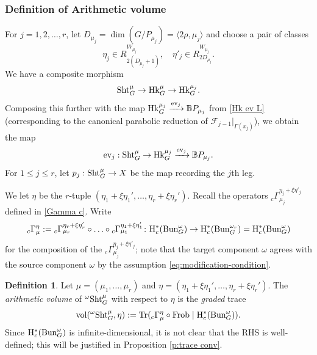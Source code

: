 \documentclass[reqno]{amsart}
\numberwithin{equation}{subsection}
\theoremstyle{definition}
\newtheorem{defn}[subsubsection]{Definition}
\def\BB{\mathbb{B}}
\newcommand\cF{\mathcal{F}}
\newcommand{\Bun}{\textup{Bun}}
\newcommand\ev{\textup{ev}}
\newcommand\Frob{\textup{Frob}}
\newcommand\Hk{\mathrm{Hk}}
\newcommand\Sht{\textup{Sht}}
\newcommand{\Tr}{\textup{Tr}}
\newcommand{\vol}{\textup{vol}}
\renewcommand{\j}[1]{\langle{#1}\rangle}
\newcommand\xr{\xrightarrow}
\newcommand\G\Gamma
\renewcommand\r\rho
\newcommand{\y}{\eta}
\newcommand{\om}{\omega}
\newcommand{\co}{\colon}
\newcommand{\rH}{\ensuremath{\mathrm{H}}\xspace}
\begin{document}
\subsubsection{Definition of Arithmetic volume}
For $j = 1, 2, \ldots, r$, let $D_{\mu_j}=\dim (G/P_{\mu_{j}})=\j{2\r, \mu_{j}}$ and choose a pair of classes
\begin{equation*}
\y_{j}\in R^{W_{\mu_{j}}}_{2(D_{\mu_j}+1)}, \quad \y'_{j}\in R^{W_{\mu_{j}}}_{2D_{\mu_j}}.
\end{equation*}
We have a composite morphism 
\begin{equation*}
\Sht^{\mu}_{G}\to \Hk_G^\mu \to \Hk_G^{\mu_{j}}.
\end{equation*}
Composing this further with the map $\Hk_G^{\mu_{j}} \xrightarrow{\ev_{j}} \BB P_{\mu_{j}}$ from \eqref{Hk ev L} (corresponding to the canonical parabolic reduction of $\cF_{j-1}|_{\G(x_j)}$), we obtain the map 
\begin{equation*}
\ev_{j}: \Sht^{\mu}_{G} \rightarrow \Hk_G^{\mu_{j}}  \xr{\ev_{j}} \BB P_{\mu_{j}}.
\end{equation*}
For $1 \leq j \leq r$, let $p_{j}: \Sht^{\mu}_{G}\to X$ be the map recording the $j$th leg. 

We let $\eta$ be the $r$-tuple $(\eta_1 + \xi \eta_1', \ldots, \eta_r + \xi \eta_r')$. Recall the operators ${}_c\G^{\eta_j + \xi \eta'_j}_{\mu_j}$ defined in \eqref{Gamma c}. Write
\[
{}_{c}\Gamma^{ \eta}_{ \mu}  :=  {}_{c}\Gamma^{\eta_r + \xi \eta'_r}_{\mu_r} \circ \ldots \circ {}_{c}\Gamma^{\eta_1+ \xi  \eta'_1}_{\mu_1} \co \rH_c^*(\Bun_G^\omega) \rightarrow \rH_c^*(\Bun_G^{\omega_r}) =   \rH_c^*(\Bun_G^\omega)
\]
for the composition of the ${}_{c}\Gamma^{\eta_j + \xi \eta'_j}_{\mu_j}$; note that the target component $\omega$ agrees with the source component $\omega$ by the assumption \eqref{eq:modification-condition}. 

\begin{defn}\label{def: arith vol}
Let $\mu = (\mu_1, \ldots, \mu_r)$ and $\eta = (\eta_1 + \xi \eta_1', \ldots, \eta_r + \xi \eta_r')$. The \emph{arithmetic volume} of ${}^{\om}\Sht^{\mu}_{G}$ with respect to $\eta$ is the \emph{graded} trace
\begin{equation}\label{gen int over ShtG}
\vol({}^{\omega}\Sht_G^\mu, \eta) := \Tr({}_{c}\Gamma^{ \eta}_{ \mu}\circ\Frob  \mid \rH_c^*(\Bun_G^\omega)).
\end{equation}
Since $\rH_c^*(\Bun_G^\omega)$ is infinite-dimensional, it is not clear that the RHS is well-defined; this will be justified in Proposition \ref{p:trace conv}.
\end{defn}
\end{document}
